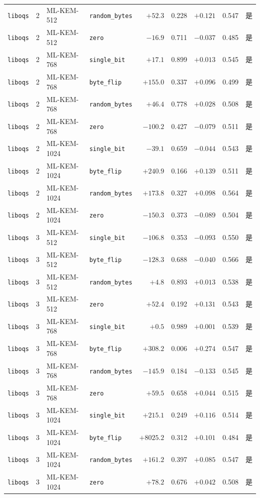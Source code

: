 \documentclass[a4paper,fontset=none]{ctexart}
\begin{document}
{\begin{longtable}[c]{lllp{2.1cm}rrrrr}
  \texttt{liboqs} & 2 & ML-KEM-512 & \texttt{random\_bytes} & $+52.3$ & 0.228 & $+0.121$ & 0.547 & 是 \\
  \texttt{liboqs} & 2 & ML-KEM-512 & \texttt{zero} & $-16.9$ & 0.711 & $-0.037$ & 0.485 & 是 \\
  \texttt{liboqs} & 2 & ML-KEM-768 & \texttt{single\_bit} & $+17.1$ & 0.899 & $+0.013$ & 0.545 & 是 \\
  \texttt{liboqs} & 2 & ML-KEM-768 & \texttt{byte\_flip} & $+155.0$ & 0.337 & $+0.096$ & 0.499 & 是 \\
  \texttt{liboqs} & 2 & ML-KEM-768 & \texttt{random\_bytes} & $+46.4$ & 0.778 & $+0.028$ & 0.508 & 是 \\
  \texttt{liboqs} & 2 & ML-KEM-768 & \texttt{zero} & $-100.2$ & 0.427 & $-0.079$ & 0.511 & 是 \\
  \texttt{liboqs} & 2 & ML-KEM-1024 & \texttt{single\_bit} & $-39.1$ & 0.659 & $-0.044$ & 0.543 & 是 \\
  \texttt{liboqs} & 2 & ML-KEM-1024 & \texttt{byte\_flip} & $+240.9$ & 0.166 & $+0.139$ & 0.511 & 是 \\
  \texttt{liboqs} & 2 & ML-KEM-1024 & \texttt{random\_bytes} & $+173.8$ & 0.327 & $+0.098$ & 0.564 & 是 \\
  \texttt{liboqs} & 2 & ML-KEM-1024 & \texttt{zero} & $-150.3$ & 0.373 & $-0.089$ & 0.504 & 是 \\
  \texttt{liboqs} & 3 & ML-KEM-512 & \texttt{single\_bit} & $-106.8$ & 0.353 & $-0.093$ & 0.550 & 是 \\
  \texttt{liboqs} & 3 & ML-KEM-512 & \texttt{byte\_flip} & $-128.3$ & 0.688 & $-0.040$ & 0.566 & 是 \\
  \texttt{liboqs} & 3 & ML-KEM-512 & \texttt{random\_bytes} & $+4.8$ & 0.893 & $+0.013$ & 0.538 & 是 \\
  \texttt{liboqs} & 3 & ML-KEM-512 & \texttt{zero} & $+52.4$ & 0.192 & $+0.131$ & 0.543 & 是 \\
  \texttt{liboqs} & 3 & ML-KEM-768 & \texttt{single\_bit} & $+0.5$ & 0.989 & $+0.001$ & 0.539 & 是 \\
  \texttt{liboqs} & 3 & ML-KEM-768 & \texttt{byte\_flip} & $+308.2$ & 0.006 & $+0.274$ & 0.547 & 是 \\
  \texttt{liboqs} & 3 & ML-KEM-768 & \texttt{random\_bytes} & $-145.9$ & 0.184 & $-0.133$ & 0.545 & 是 \\
  \texttt{liboqs} & 3 & ML-KEM-768 & \texttt{zero} & $+59.5$ & 0.658 & $+0.044$ & 0.515 & 是 \\
  \texttt{liboqs} & 3 & ML-KEM-1024 & \texttt{single\_bit} & $+215.1$ & 0.249 & $+0.116$ & 0.514 & 是 \\
  \texttt{liboqs} & 3 & ML-KEM-1024 & \texttt{byte\_flip} & $+8025.2$ & 0.312 & $+0.101$ & 0.484 & 是 \\
  \texttt{liboqs} & 3 & ML-KEM-1024 & \texttt{random\_bytes} & $+161.2$ & 0.397 & $+0.085$ & 0.547 & 是 \\
  \texttt{liboqs} & 3 & ML-KEM-1024 & \texttt{zero} & $+78.2$ & 0.676 & $+0.042$ & 0.508 & 是 \\
\end{longtable}
}
\end{document}
